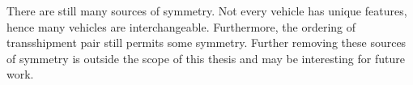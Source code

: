There are still many sources of symmetry.
Not every vehicle has unique features, hence many vehicles are interchangeable.
Furthermore, the ordering of transshipment pair still permits some symmetry.
Further removing these  sources of symmetry is outside the scope of this thesis and may be interesting for future work.
%
%
%
%
%
%
%

